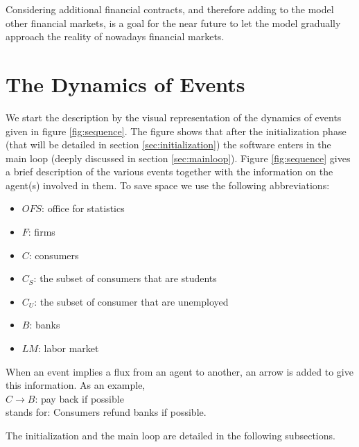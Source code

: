 \documentclass{book}
\begin{document}
Considering additional financial contracts, and therefore adding to the model other financial markets, is a goal for the near future to let the model gradually approach the reality of nowadays financial markets.




\newpage
\chapter{The Dynamics of Events}\label{chap:events}

We start the description by the visual representation of the dynamics of events given in figure \ref{fig:sequence}. The figure shows that after the initialization phase (that will be detailed in section \ref{sec:initialization}) the software enters in the main loop (deeply discussed in section \ref{sec:mainloop}). Figure \ref{fig:sequence} gives a brief description of the various events together with the information on the agent(s) involved in them. To save space we use the following abbreviations:

\begin{itemize}
	\item $OFS$: office for statistics
	\item $F$: firms
	\item $C$: consumers
	\item $C_S$: the subset of consumers that are students
	\item $C_U$: the subset of consumer that are unemployed
	\item $B$: banks
	\item $LM$: labor market
\end{itemize}

When an event implies a flux from an agent to another, an arrow is added to give this information. As an example,\\
$C \rightarrow B$: pay back if possible\\
stands for: Consumers refund banks if possible.

The initialization and the main loop are detailed in the following subsections.
\end{document}
